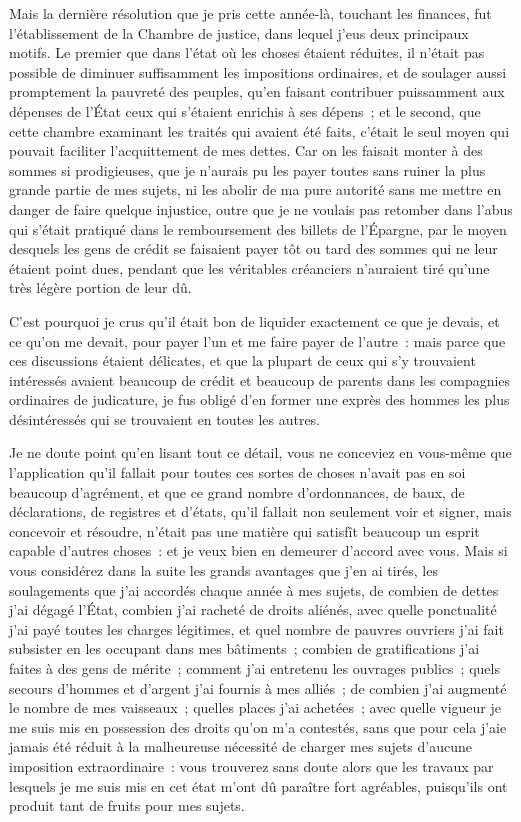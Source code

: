 \documentclass[french,twoside]{book} %
\begin{document}
Mais la dernière résolution que je pris cette année-là, touchant les finances, fut l’établissement de la Chambre de justice, dans lequel j’eus deux principaux motifs. Le premier que dans l’état où les choses étaient réduites, il n’était pas possible de diminuer suffisamment les impositions ordinaires, et de soulager aussi promptement la pauvreté des peuples, qu’en faisant contribuer puissamment aux dépenses de l’État ceux qui s’étaient enrichis à ses dépens ; et le second, que cette chambre examinant les traités qui avaient été faits, c’était le seul moyen qui pouvait faciliter l’acquittement de mes dettes. Car on les faisait monter à des sommes si prodigieuses, que je n’aurais pu les payer toutes sans ruiner la plus grande partie de mes sujets, ni les abolir de ma pure autorité sans me mettre en danger de faire quelque injustice, outre que je ne voulais pas retomber dans l’abus qui s’était pratiqué dans le remboursement des billets de l’Épargne, par le moyen desquels les gens de crédit se faisaient payer tôt ou tard des sommes qui ne leur étaient point dues, pendant que les véritables créanciers n’auraient tiré qu’une très légère portion de leur dû.\par
C’est pourquoi je crus qu’il était bon de liquider exactement ce que je devais, et ce qu’on me devait, pour payer l’un et me faire payer de l’autre : mais parce que ces discussions étaient délicates, et que la plupart de ceux qui s’y trouvaient intéressés avaient beaucoup de crédit et beaucoup de parents dans les compagnies ordinaires de judicature, je fus obligé d’en former une exprès des hommes les plus désintéressés qui se trouvaient en toutes les autres.\par
Je ne doute point qu’en lisant tout ce détail, vous ne conceviez en vous-même que l’application qu’il fallait pour toutes ces sortes de choses n’avait pas en soi beaucoup d’agrément, et que ce grand nombre d’ordonnances, de baux, de déclarations, de registres et d’états, qu’il fallait non seulement voir et signer, mais concevoir et résoudre, n’était pas une matière qui satisfît beaucoup un esprit capable d’autres choses : et je veux bien en demeurer d’accord avec vous. Mais si vous considérez dans la suite les grands avantages que j’en ai tirés, les soulagements que j’ai accordés chaque année à mes sujets, de combien de dettes j’ai dégagé l’État, combien j’ai racheté de droits aliénés, avec quelle ponctualité j’ai payé toutes les charges légitimes, et quel nombre de pauvres ouvriers j’ai fait subsister en les occupant dans mes bâtiments ; combien de gratifications j’ai faites à des gens de mérite ; comment j’ai entretenu les ouvrages publics ; quels secours d’hommes et d’argent j’ai fournis à mes alliés ; de combien j’ai augmenté le nombre de mes vaisseaux ; quelles places j’ai achetées ; avec quelle vigueur je me suis mis en possession des droits qu’on m’a contestés, sans que pour cela j’aie jamais été réduit à la malheureuse nécessité de charger mes sujets d’aucune imposition extraordinaire : vous trouverez sans doute alors que les travaux par lesquels je me suis mis en cet état m’ont dû paraître fort agréables, puisqu’ils ont produit tant de fruits pour mes sujets.\par
\end{document}
